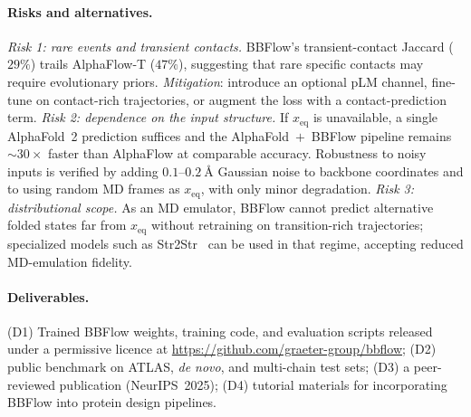 \documentclass[12pt]{article}
\begin{document}
\paragraph{Risks and alternatives.}
\emph{Risk 1: rare events and transient contacts.} BBFlow's transient-contact
Jaccard ($29\%$) trails AlphaFlow-T ($47\%$), suggesting that rare specific
contacts may require evolutionary priors. \emph{Mitigation}: introduce an
optional pLM channel, fine-tune on contact-rich trajectories, or augment the
loss with a contact-prediction term. \emph{Risk 2: dependence on the input
structure.} If $x_{\mathrm{eq}}$ is unavailable, a single AlphaFold~2 prediction
suffices and the AlphaFold~$+$~BBFlow pipeline remains $\sim 30\times$ faster than
AlphaFlow at comparable accuracy. Robustness to noisy inputs is verified by
adding $0.1$--$0.2~$\AA{} Gaussian noise to backbone coordinates and to using random
MD frames as $x_{\mathrm{eq}}$, with only minor degradation. \emph{Risk 3:
distributional scope.} As an MD emulator, BBFlow cannot predict alternative
folded states far from $x_{\mathrm{eq}}$ without retraining on transition-rich
trajectories; specialized models such as Str2Str~\cite{lu2024str2str} can be
used in that regime, accepting reduced MD-emulation fidelity.

\paragraph{Deliverables.}
(D1) Trained BBFlow weights, training code, and evaluation scripts released
under a permissive licence at \url{https://github.com/graeter-group/bbflow};
(D2) public benchmark on ATLAS, \emph{de novo}, and multi-chain test sets;
(D3) a peer-reviewed publication (NeurIPS~2025); (D4) tutorial materials for
incorporating BBFlow into protein design pipelines.
\end{document}
